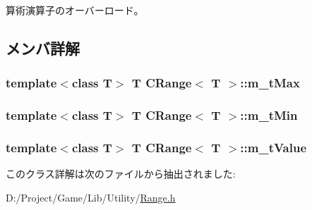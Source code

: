 算術演算子のオーバーロード。 



\subsection{メンバ詳解}
\hypertarget{class_c_range_a913f82d7153c73dba1709d3aaf46e141}{}
\subsubsection[{m\+\_\+t\+Max}]{\setlength{\rightskip}{0pt plus 5cm}template$<$class T$>$ T {\bf C\+Range}$<$ T $>$\+::m\+\_\+t\+Max\hspace{0.3cm}{\ttfamily [private]}}\label{class_c_range_a913f82d7153c73dba1709d3aaf46e141}
\hypertarget{class_c_range_ade945f039df9fb701105a83811f6da95}{}
\subsubsection[{m\+\_\+t\+Min}]{\setlength{\rightskip}{0pt plus 5cm}template$<$class T$>$ T {\bf C\+Range}$<$ T $>$\+::m\+\_\+t\+Min\hspace{0.3cm}{\ttfamily [private]}}\label{class_c_range_ade945f039df9fb701105a83811f6da95}
\hypertarget{class_c_range_a0efe8d572177862cca74bc817ee68b85}{}
\subsubsection[{m\+\_\+t\+Value}]{\setlength{\rightskip}{0pt plus 5cm}template$<$class T$>$ T {\bf C\+Range}$<$ T $>$\+::m\+\_\+t\+Value\hspace{0.3cm}{\ttfamily [private]}}\label{class_c_range_a0efe8d572177862cca74bc817ee68b85}


このクラス詳解は次のファイルから抽出されました\+:\begin{DoxyCompactItemize}
\item 
D\+:/\+Project/\+Game/\+Lib/\+Utility/\hyperlink{_range_8h}{Range.\+h}\end{DoxyCompactItemize}
